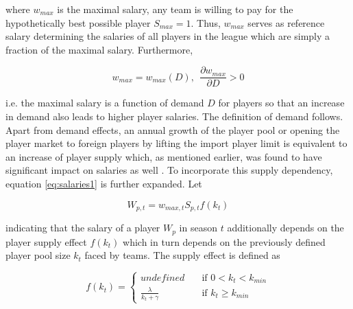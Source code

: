 \documentclass[12pt, a4paper]{article}
\begin{document}
\noindent
where $w_{max}$ is the maximal salary, any team is willing to pay for the hypothetically best possible player $S_{max}=1$. Thus, $w_{max}$ serves as reference salary determining the salaries of all players in the league which are simply a fraction of the maximal salary. Furthermore,

\begin{equation}
w_{max}=w_{max}\left(D\right),\ \ \frac{\partial w_{max}}{\partial D}>0
\end{equation}

\noindent
i.e. the maximal salary is a function of demand $D$ for players so that an increase in demand also leads to higher player salaries. The definition of demand follows. Apart from demand effects, an annual growth of the player pool or opening the player market to foreign players by lifting the import player limit is equivalent to an increase of player supply which, as mentioned earlier, was found to have significant impact on salaries as well \citep[see][]{bryson_all-star_2017,longhi_meta-analytic_2005,llull_effect_2018}. To incorporate this supply dependency, equation \ref{eq:salaries1} is further expanded. Let 

\begin{equation}\label{eq:salaries2}
W_{p,t}=w_{max,t}S_{p,t}f(k_t)
\end{equation}


\noindent
indicating that the salary of a player $W_p$ in season $t$ additionally depends on the player supply effect $f(k_t)$ which in turn depends on the previously defined player pool size $k_t$ faced by teams. The supply effect is defined as


\begin{equation}
f(k_t) =
\begin{cases}
undefined & \quad \text{if } 0 < k_t < k_{min} \\
\frac{\lambda}{k_t+\gamma} & \quad \text{if } k_t \geq k_{min} 
\end{cases}
\end{equation}
\end{document}
